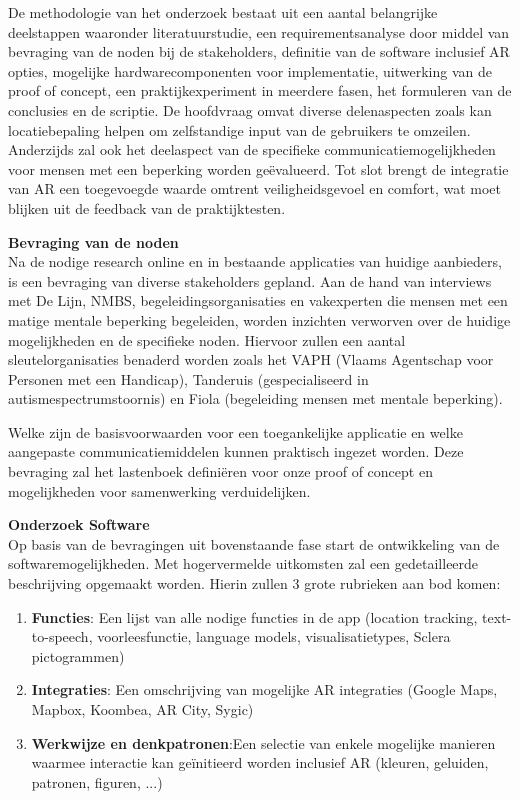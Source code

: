 \documentclass{hogent-article}
\begin{document}
    De methodologie van het onderzoek bestaat uit een aantal belangrijke deelstappen waaronder literatuurstudie, een requirementsanalyse door middel van bevraging van de noden bij de stakeholders, definitie van de software inclusief AR opties, mogelijke hardwarecomponenten voor implementatie, uitwerking van de proof of concept, een praktijkexperiment in meerdere fasen, het formuleren van de conclusies en de scriptie. De hoofdvraag omvat diverse delenaspecten zoals kan locatiebepaling helpen om zelfstandige input van de gebruikers te omzeilen. Anderzijds zal ook het deelaspect van de specifieke communicatiemogelijkheden voor mensen met een beperking worden geëvalueerd. Tot slot brengt de integratie van AR een toegevoegde waarde omtrent veiligheidsgevoel en comfort, wat moet blijken uit de feedback van de praktijktesten.
    
    \textbf{Bevraging van de noden} \\
    
    Na de nodige research online en in bestaande applicaties van huidige aanbieders, is een bevraging van diverse stakeholders gepland. Aan de hand van interviews met De Lijn, NMBS, begeleidingsorganisaties en vakexperten die mensen met een matige mentale beperking begeleiden, worden inzichten verworven over de huidige mogelijkheden en de specifieke noden. Hiervoor zullen een aantal sleutelorganisaties benaderd worden zoals het VAPH (Vlaams Agentschap voor Personen met een Handicap), Tanderuis (gespecialiseerd in autismespectrumstoornis) en Fiola (begeleiding mensen met mentale beperking).

    Welke zijn de basisvoorwaarden voor een toegankelijke applicatie en welke aangepaste communicatiemiddelen kunnen praktisch ingezet worden. Deze bevraging zal het lastenboek definiëren voor onze proof of concept en mogelijkheden voor samenwerking verduidelijken. 
    
    \textbf{Onderzoek Software} \\
    
    Op basis van de bevragingen uit bovenstaande fase start de ontwikkeling van de softwaremogelijkheden. Met hogervermelde uitkomsten zal een gedetailleerde beschrijving opgemaakt worden. Hierin zullen 3 grote rubrieken aan bod komen:
    
    \begin{enumerate}
        \item \textbf{Functies}: Een lijst van alle nodige functies in de app (location tracking, text-to-speech, voorleesfunctie, language models, visualisatietypes, Sclera pictogrammen)
        \item \textbf{Integraties}: Een omschrijving van mogelijke AR integraties (Google Maps, Mapbox, Koombea, AR City, Sygic)
        \item \textbf{Werkwijze en denkpatronen}:Een selectie van enkele mogelijke manieren waarmee interactie kan geïnitieerd worden inclusief AR (kleuren, geluiden, patronen, figuren, ...)
    \end{enumerate}
\end{document}
